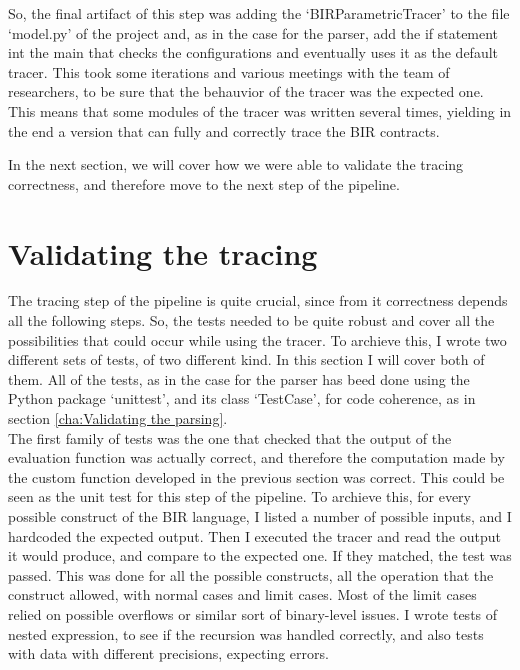 So, the final artifact of this step was adding the `BIRParametricTracer' to the
file `model.py' of the project and, as in the case for the parser, add the if
statement int the main that checks the configurations and eventually uses it as
the default tracer. This took some iterations and various meetings with the team
of researchers, to be sure that the behauvior of the tracer was the expected one.
This means that some modules of the tracer was written several times, yielding
in the end a version that can fully and correctly trace the BIR contracts.

In the next section, we will cover how we were able to validate the tracing correctness,
and therefore move to the next step of the pipeline.

\section{Validating the tracing}
\label{cha:Validating the tracing} The tracing step of the pipeline is quite
crucial, since from it correctness depends all the following steps. So, the tests
needed to be quite robust and cover all the possibilities that could occur while
using the tracer. To archieve this, I wrote two different sets of tests, of two
different kind. In this section I will cover both of them. All of the tests, as in
the case for the parser has beed done using the Python package `unittest', and
its class `TestCase', for code coherence, as in section
\ref{cha:Validating the parsing}. \\

The first family of tests was the one that checked that the output of the
evaluation function was actually correct, and therefore the computation made by the
custom function developed in the previous section was correct. This could be
seen as the unit test for this step of the pipeline. To archieve this, for every
possible construct of the BIR language, I listed a number of possible inputs,
and I hardcoded the expected output. Then I executed the tracer and read the output
it would produce, and compare to the expected one. If they matched, the test was
passed. This was done for all the possible constructs, all the operation that
the construct allowed, with normal cases and limit cases. Most of the limit
cases relied on possible overflows or similar sort of binary-level issues. I wrote
tests of nested expression, to see if the recursion was handled correctly, and also
tests with data with different precisions, expecting errors.

